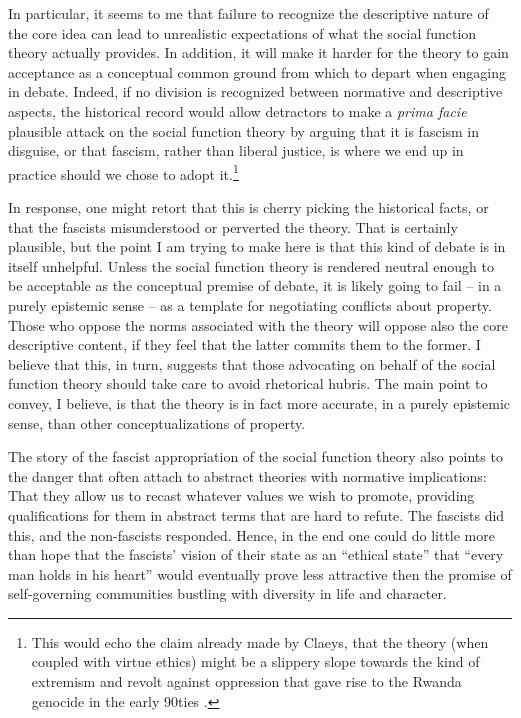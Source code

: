 In particular, it seems to me that failure to recognize the descriptive nature of the core idea can lead to unrealistic expectations of what the social function theory actually provides. In addition, it will make it harder for the theory to gain acceptance as a conceptual common ground from which to depart when engaging in debate. Indeed, if no division is recognized between normative and descriptive aspects, the historical record would allow detractors to make a {\it prima facie} plausible attack on the social function theory by arguing that it is fascism in disguise, or that fascism, rather than liberal justice, is where we end up in practice should we chose to adopt it.\footnote{This would echo the claim already made by Claeys, that the theory (when coupled with virtue ethics) might be a slippery slope towards the kind of extremism and revolt against oppression that gave rise to the Rwanda genocide in the early 90ties \cite{.....}.}

In response, one might retort that this is cherry picking the historical facts, or that the fascists misunderstood or perverted the theory. That is certainly plausible, but the point I am trying to make here is that this kind of debate is in itself unhelpful. Unless the social function theory is rendered neutral enough to be acceptable as the conceptual premise of debate, it is likely going to fail -- in a purely epistemic sense -- as a template for negotiating conflicts about property. Those who oppose the norms associated with the theory will oppose also the core descriptive content, if they feel that the latter commits them to the former. I believe that this, in turn, suggests that those advocating on behalf of the social function theory should take care to avoid rhetorical hubris. The main point to convey, I believe, is that the theory is in fact more accurate, in a purely epistemic sense, than other conceptualizations of property.

The story of the fascist appropriation of the social function theory also points to the danger that often attach to abstract theories with normative implications: That they allow us to recast whatever values we wish to promote, providing qualifications for them in abstract terms that are hard to refute. The fascists did this, and the non-fascists responded. Hence, in the end one could do little more than hope that the fascists' vision of their state as an ``ethical state'' that ``every man holds in his heart'' would eventually prove less attractive then the promise of self-governing communities bustling with diversity in life and character.


